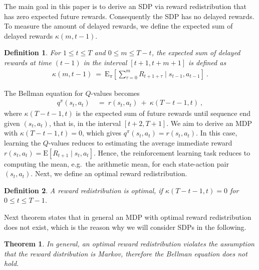 \documentclass{article}
\newtheorem{theoremA}{Theorem}
\newtheorem{definitionA}{Definition}
\newcommand\EXP{\mathbf{\mathrm{E}}}
\renewcommand{\leq}{\leqslant}
\begin{document}
\begin{appendices}
The main goal in this paper is to derive 
an SDP via reward redistribution 
that has zero expected future rewards.
Consequently the SDP has no delayed rewards.
To measure the amount of delayed rewards,
we define the expected sum of delayed rewards $\kappa(m,t-1)$.
\begin{definitionA}
For $1 \leq t\leq T$ and $0\leq m\leq T-t$,  
the expected sum of delayed rewards at time $(t-1)$ 
in the interval $[t+1,t+m+1]$ is defined as
\begin{align}
 \kappa(m,t-1) \ = \ \EXP_{\pi} \left[ \sum_{\tau=0}^{m} R_{t+1+\tau}  
  \mid s_{t-1}, a_{t-1} \right]  \ .
\end{align}
\end{definitionA}
The Bellman equation for $Q$-values becomes
\begin{align}
    q^\pi(s_t,a_t) \ &= \   r(s_t,a_t) \ + \ \kappa(T-t-1,t) \ ,
\end{align} 
where $\kappa(T-t-1,t)$ 
is the expected sum of future rewards until sequence end given $(s_t,a_t)$, 
that is, in the interval $[t+2,T+1]$. 
We aim to derive an MDP with $\kappa(T-t-1,t)=0$,
which gives $q^\pi(s_t,a_t) =  r(s_t,a_t)$.
In this case, 
learning the $Q$-values reduces to estimating the average immediate reward
$r(s_t,a_t) = \EXP \left[ R_{t+1} \mid s_t,a_t\right]$.
Hence, the reinforcement learning task reduces to computing 
the mean, e.g.\ the arithmetic mean, for each
state-action pair $(s_t,a_t)$.
Next, we define an optimal reward redistribution.
\begin{definitionA}
A reward redistribution is optimal,  
if  $\kappa(T-t-1,t) = 0$ for $0\leq t \leq T-1$.
\end{definitionA}

Next theorem states that in general an MDP with optimal reward
redistribution does not exist, which
is the reason why we will consider SDPs in the following.
\begin{theoremA}
\label{th:Aviolate}
In general, an optimal reward redistribution violates
the assumption that the reward distribution is Markov, 
therefore the Bellman equation does not hold.
\end{theoremA}


\end{appendices}
\end{document}
